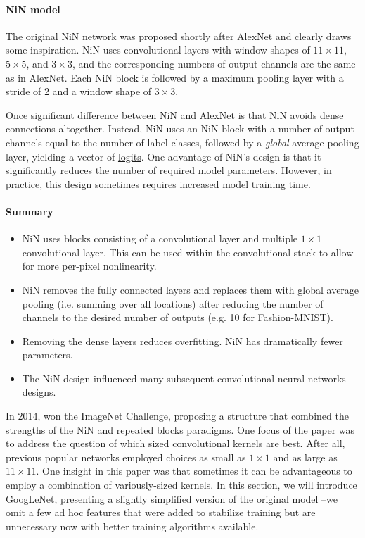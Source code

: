 \paragraph{NiN model}

The original NiN network was proposed shortly after AlexNet and clearly draws some inspiration. NiN uses convolutional layers with window shapes of $11\times 11$, $5\times 5$, and $3\times 3$, and the corresponding numbers of output channels are the same as in AlexNet. Each NiN block is followed by a maximum pooling layer with a stride of 2 and a window shape of $3\times 3$.

Once significant difference between NiN and AlexNet is that NiN avoids dense connections altogether. Instead, NiN uses an NiN block with a number of output channels equal to the number of label classes, followed by a \textit{global} average pooling layer, yielding a vector of \href{https://en.wikipedia.org/wiki/Logit}{logits}. One advantage of NiN's design is that it significantly reduces the number of required model parameters. However, in practice, this design sometimes requires increased model training time.

\paragraph{Summary}

\begin{itemize}
    \item NiN uses blocks consisting of a convolutional layer and multiple $1\times 1$ convolutional layer. This can be used within the convolutional stack to allow for more per-pixel nonlinearity.
    \item NiN removes the fully connected layers and replaces them with global average pooling (i.e. summing over all locations) after reducing the number of channels to the desired number of outputs (e.g. 10 for Fashion-MNIST).
    \item Removing the dense layers reduces overfitting. NiN has dramatically fewer parameters.
    \item The NiN design influenced many subsequent convolutional neural networks designs.
\end{itemize}


In 2014, \citet{Szegedy2015} won the ImageNet Challenge, proposing a structure that combined the strengths of the NiN and repeated blocks paradigms. One focus of the paper was to address the question of which sized convolutional kernels are best. After all, previous popular networks employed choices as small as $1 \times 1$ and as large as $11 \times 11$. One insight in this paper was that sometimes it can be advantageous to employ a combination of variously-sized kernels. In this section, we will introduce GoogLeNet, presenting a slightly simplified version of the original model --we omit a few ad hoc features that were added to stabilize training
but are unnecessary now with better training algorithms available. 

